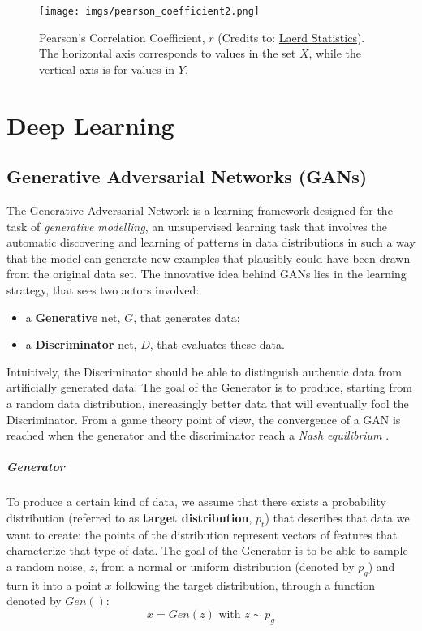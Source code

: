 \documentclass[target=mst,aauheader=aics]{thud}
\theoremstyle{definition}
\begin{document}
	\begin{figure}
		\centering
		\texttt{[image: imgs/pearson\_coefficient2.png]}
		\captionsetup{width=0.7\textwidth}
		\caption{Pearson's Correlation Coefficient, $r$ (Credits to: \href{https://statistics.laerd.com/statistical-guides/pearson-correlation-coefficient-statistical-guide.php}{Laerd Statistics}). The horizontal axis corresponds to values in the set $X$, while the vertical axis is for values in $Y$.}
		\label{fig:pearson}
	\end{figure}
	
	\chapter{Deep Learning}\label{appendix:dl}
	\section{Generative Adversarial Networks (GANs)}
	The Generative Adversarial Network \cite{Goodfellow2014} is a learning framework designed for the task of \textit{generative modelling}, an unsupervised learning task that involves the automatic discovering and learning of patterns in data distributions in such a way that the model can generate new examples that plausibly could have been drawn from the original data set. The innovative idea behind GANs lies in the learning strategy, that sees two actors involved:
	\begin{itemize}
		\item a \textbf{Generative} net, $G$, that generates data;
		\item a \textbf{Discriminator} net, $D$, that evaluates these data.
	\end{itemize}
	Intuitively, the Discriminator should be able to distinguish authentic data from artificially generated data. The goal of the Generator is to produce, starting from a random data distribution, increasingly better data that will eventually fool the Discriminator. From a game theory point of view, the convergence of a GAN is reached when the generator and the discriminator reach a \textit{Nash equilibrium} \cite{Ratliff2013}.
	\paragraph{Generator}
	To produce a certain kind of data, we assume that there exists a probability distribution (referred to as \textbf{target distribution}, $p_t$) that describes that data we want to create: the points of the distribution represent vectors of features that characterize that type of data. The goal of the Generator is to be able to sample a random noise, $z$, from a normal or uniform distribution (denoted by $p_g$) and turn it into a point $x$  following the target distribution, through a function denoted by $Gen()$:
	\[
	x = Gen(z) \text{ with } z \sim p_g
	\]
	
\end{document}
